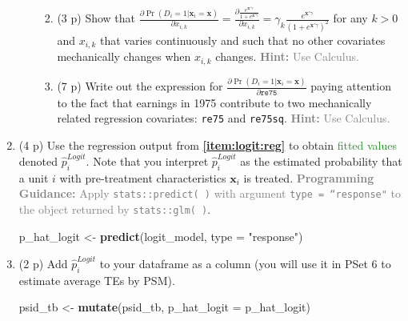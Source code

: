 \documentclass[
]{article}
\newenvironment{Shaded}{\begin{snugshade}}{\end{snugshade}}
\newcommand{\AttributeTok}[1]{\textcolor[rgb]{0.13,0.29,0.53}{#1}}
\newcommand{\FunctionTok}[1]{\textcolor[rgb]{0.13,0.29,0.53}{\textbf{#1}}}
\newcommand{\NormalTok}[1]{#1}
\newcommand{\OtherTok}[1]{\textcolor[rgb]{0.56,0.35,0.01}{#1}}
\newcommand{\StringTok}[1]{\textcolor[rgb]{0.31,0.60,0.02}{#1}}
\begin{document}
\begin{enumerate}
\begin{enumerate}
    \begin{enumerate}
    \def\labelenumiii{\roman{enumiii}.}
    \item
      (3 p) Show that
      \(\frac{\partial \Pr(D_i=1|\mathbf{x}_{i}=\mathbf{x})}{\partial x_{i,k}}=\frac{\partial \frac{e^{\mathbf{x}'\gamma}}{1+ e^{\mathbf{x}'\gamma}}}{\partial x_{i,k}}= \gamma_k \frac{e^{\mathbf{x}'\gamma}}{(1+e^{\mathbf{x}'\gamma})^2}\)
      for any \(k >0\) and \(x_{i,k}\) that varies continuously and such
      that no other covariates mechanically changes when \(x_{i,k}\)
      changes.
      \textcolor{gray}{\textbf{Hint:} Use Calculus.}\label{item:logit:partial}
    \item
      (7 p) Write out the expression for
      \(\frac{\partial \Pr(D_i=1|\mathbf{x}_{i}=\mathbf{x})}{\partial \texttt{re75}}\)
      paying attention to the fact that earnings in 1975 contribute to
      two mechanically related regression covariates: \texttt{re75} and
      \texttt{re75sq}.
      \textcolor{gray}{\textbf{Hint:} Use Calculus.}\label{item:logit:delta-pscore-re75}
    \end{enumerate}
  \end{enumerate}
\item
  (4 p) Use the regression output from \textbf{\ref{item:logit:reg}} to
  obtain \textcolor{ForestGreen}{fitted values} denoted
  \(\hat{p}_i^{Logit}\). Note that you interpret \(\hat{p}_i^{Logit}\)
  as the estimated probability that a unit \(i\) with pre-treatment
  characteristics \(\mathbf{x}_i\) is treated.
  \textcolor{gray}{\textbf{Programming Guidance:} Apply \texttt{stats::predict( )} with argument \texttt{type = ``response"} to the object returned by \texttt{stats::glm( )}}.\label{item:logit:fitted}

\begin{Shaded}
\begin{Highlighting}[]
\NormalTok{p\_hat\_logit }\OtherTok{\textless{}{-}} \FunctionTok{predict}\NormalTok{(logit\_model, }\AttributeTok{type =} \StringTok{"response"}\NormalTok{)}
\end{Highlighting}
\end{Shaded}
\item
  (2 p) Add \(\hat{p}_i^{Logit}\) to your dataframe as a column (you
  will use it in PSet 6 to estimate average TEs by PSM).

\begin{Shaded}
\begin{Highlighting}[]
\NormalTok{psid\_tb }\OtherTok{\textless{}{-}} \FunctionTok{mutate}\NormalTok{(psid\_tb, }\AttributeTok{p\_hat\_logit =}\NormalTok{ p\_hat\_logit)}
\end{Highlighting}
\end{Shaded}


\end{enumerate}
\end{document}

